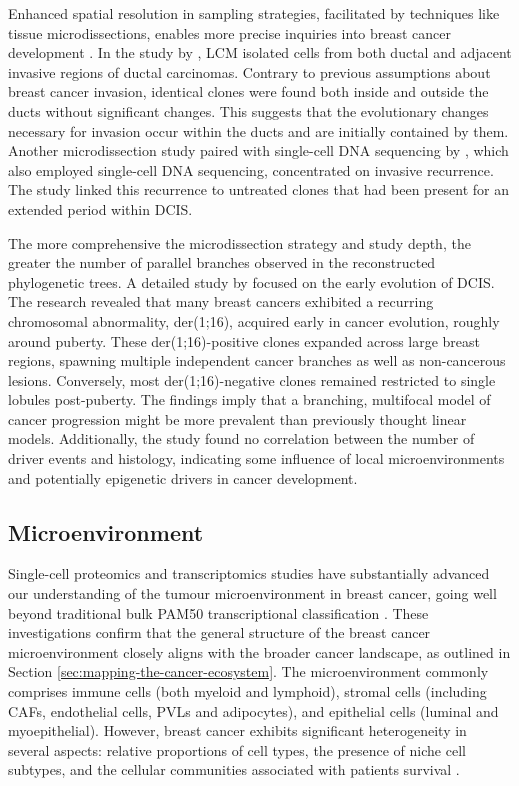 Enhanced spatial resolution in sampling strategies, facilitated by techniques like tissue microdissections, enables more precise inquiries into breast cancer development . In the study by \textcite{Casasent2018-gx}, \ac{LCM} isolated cells from both ductal and adjacent invasive regions of ductal carcinomas. Contrary to previous assumptions about breast cancer invasion, identical clones were found both inside and outside the ducts without significant changes. This suggests that the evolutionary changes necessary for invasion occur within the ducts and are initially contained by them. Another microdissection study paired with single-cell DNA sequencing by \textcite{Lips2022-kv}, which also employed single-cell DNA sequencing, concentrated on invasive recurrence. The study linked this recurrence to untreated clones that had been present for an extended period within \ac{DCIS}.

The more comprehensive the microdissection strategy and study depth, the greater the number of parallel branches observed in the reconstructed phylogenetic trees. A detailed study by \parencite{Nishimura2023-mk} focused on the early evolution of \ac{DCIS}. The research revealed that many breast cancers exhibited a recurring chromosomal abnormality, der(1;16), acquired early in cancer evolution, roughly around puberty. These der(1;16)-positive clones expanded across large breast regions, spawning multiple independent cancer branches as well as non-cancerous lesions. Conversely, most der(1;16)-negative clones remained restricted to single lobules post-puberty. The findings imply that a branching, multifocal model of cancer progression might be more prevalent than previously thought linear models. Additionally, the study found no correlation between the number of driver events and histology, indicating some influence of local microenvironments and potentially epigenetic drivers in cancer development.

\subsection{Microenvironment}

Single-cell proteomics and transcriptomics studies have substantially advanced our understanding of the tumour microenvironment in breast cancer, going well beyond traditional bulk PAM50 transcriptional classification \parencite{Wu2021-uq,Pal2021-rf,Wagner2019-zp}. These investigations confirm that the general structure of the breast cancer microenvironment closely aligns with the broader cancer landscape, as outlined in Section \cref{sec:mapping-the-cancer-ecosystem}. The microenvironment commonly comprises immune cells (both myeloid and lymphoid), stromal cells (including \acfp{CAF}, endothelial cells, \acfp{PVL} and adipocytes), and epithelial cells (luminal and myoepithelial). However, breast cancer exhibits significant heterogeneity in several aspects: relative proportions of cell types, the presence of niche cell subtypes, and the cellular communities associated with patients survival \parencite{Jackson2020-em, Danenberg2022-zb}.

